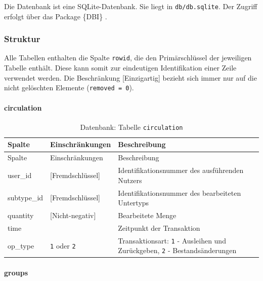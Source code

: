 \documentclass[
]{article}
\begin{document}
Die Datenbank ist eine SQLite-Datenbank. Sie liegt in \texttt{db/db.sqlite}. Der Zugriff erfolgt über das Package \{DBI\} \autocite{R-DBI}.

\hypertarget{struktur}{%
\subsubsection{Struktur}\label{struktur}}

Alle Tabellen enthalten die Spalte \texttt{rowid}, die den Primärschlüssel der jeweiligen Tabelle enthält. Diese kann somit zur eindeutigen Identifikation einer Zeile verwendet werden. Die Beschränkung {[}Einzigartig{]} bezieht sich immer nur auf die nicht gelöschten Elemente (\texttt{removed\ =\ 0}).

\hypertarget{circulation}{%
\paragraph{circulation}\label{circulation}}

\begin{longtable}[]{@{}
  >{\raggedright\arraybackslash}p{}
  >{\raggedright\arraybackslash}p{}
  >{\raggedright\arraybackslash}p{}@{}}
\caption{\label{tab:circulation} Datenbank: Tabelle \texttt{circulation}}\tabularnewline
\toprule
Spalte & Einschränkungen & Beschreibung \\
\midrule
\endfirsthead
\toprule
Spalte & Einschränkungen & Beschreibung \\
\midrule
\endhead
user\_id & {[}Fremdschlüssel{]} & Identifikationsnummer des ausführenden Nutzers \\
subtype\_id & {[}Fremdschlüssel{]} & Identifikationsnummer des bearbeiteten Untertyps \\
quantity & {[}Nicht-negativ{]} & Bearbeitete Menge \\
time & & Zeitpunkt der Transaktion \\
op\_type & \texttt{1} oder \texttt{2} & Transaktionsart: \texttt{1} - Ausleihen und Zurückgeben, \texttt{2} - Bestandsänderungen \\
\bottomrule
\end{longtable}

\hypertarget{groups}{%
\paragraph{groups}\label{groups}}
\end{document}
